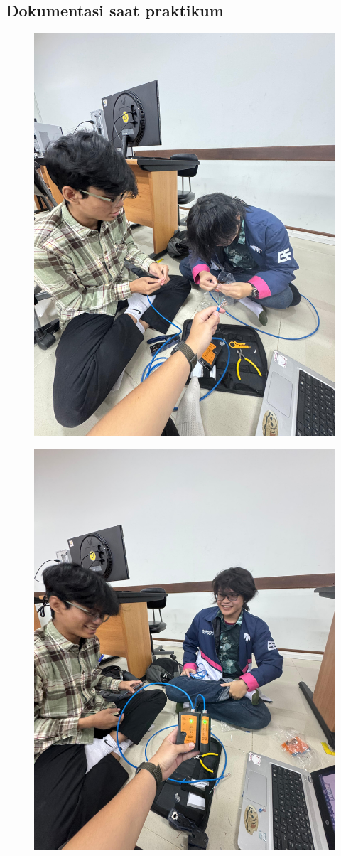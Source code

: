 \subsection{Dokumentasi saat praktikum}
\begin{figure}[H]
    \centering
    \includegraphics[width=0.65\linewidth]{image/crimping1.jpg}
    \label{fig:inirujukan}
\end{figure}
\begin{figure}[H]
    \centering
    \includegraphics[width=0.65\linewidth]{image/crimping2.jpg}
    \label{fig:inirujukan}
\end{figure}
